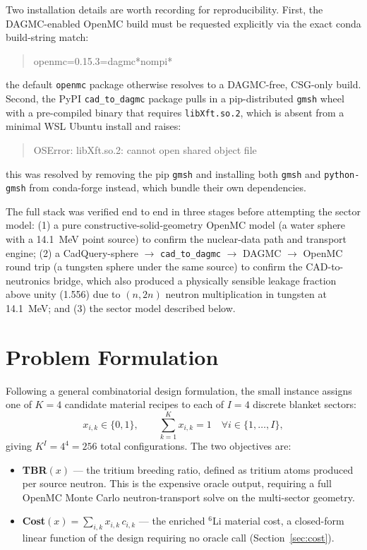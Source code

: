 \documentclass[11pt]{article}
\begin{document}
Two installation details are worth recording for reproducibility. First,
the DAGMC-enabled OpenMC build must be requested explicitly via the exact
conda build-string match:
\begin{quote}
\ttfamily openmc=0.15.3=dagmc*nompi*
\end{quote}
the default \texttt{openmc} package otherwise resolves to a DAGMC-free,
CSG-only build. Second, the PyPI \texttt{cad\_to\_dagmc} package pulls in
a pip-distributed \texttt{gmsh} wheel with a pre-compiled binary that
requires \texttt{libXft.so.2}, which is absent from a minimal WSL Ubuntu
install and raises:
\begin{quote}
\ttfamily OSError: libXft.so.2: cannot open shared object file
\end{quote}
this was resolved by removing the pip \texttt{gmsh} and installing both
\texttt{gmsh} and \texttt{python-gmsh} from conda-forge instead, which
bundle their own dependencies.

The full stack was verified end to end in three stages before attempting
the sector model: (1) a pure constructive-solid-geometry OpenMC model (a
water sphere with a 14.1~MeV point source) to confirm the nuclear-data path
and transport engine; (2) a CadQuery-sphere $\to$ \texttt{cad\_to\_dagmc}
$\to$ DAGMC $\to$ OpenMC
round trip (a tungsten sphere under the same source) to confirm the
CAD-to-neutronics bridge, which also produced a physically sensible
leakage fraction above unity (1.556) due to $(n,2n)$ neutron multiplication
in tungsten at 14.1~MeV; and (3) the sector model described below.

\section{Problem Formulation}

Following a general combinatorial design formulation, the
small instance assigns one of $K=4$ candidate material recipes to each of
$I=4$ discrete blanket sectors:
\[
x_{i,k}\in\{0,1\},\qquad \sum_{k=1}^{K} x_{i,k}=1 \quad \forall i\in\{1,\dots,I\},
\]
giving $K^I = 4^4 = 256$ total configurations. The two objectives are:

\begin{itemize}
\item \textbf{TBR$(x)$} --- the tritium breeding ratio, defined as tritium
atoms produced per source neutron. This is the expensive oracle output,
requiring a full OpenMC Monte Carlo neutron-transport solve on the
multi-sector geometry.
\item \textbf{Cost$(x) = \sum_{i,k} x_{i,k}\,c_{i,k}$} --- the enriched
$^6$Li material cost, a closed-form linear function of the design requiring
no oracle call (Section~\ref{sec:cost}).
\end{itemize}
\end{document}
